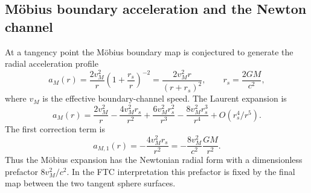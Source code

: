 \documentclass[11pt,a4paper]{article}
\begin{document}
\subsection{M\"obius boundary acceleration and the Newton channel}

At a tangency point the M\"obius boundary map is conjectured to generate the
radial acceleration profile
\begin{equation}
  a_M(r)=\frac{2v_M^2}{r}\!\left(1+\frac{r_s}{r}\right)^{-2}
       =\frac{2v_M^2r}{(r+r_s)^2},\qquad
  r_s=\frac{2GM}{c^2},
  \label{eq:mobius_accel}
\end{equation}
where $v_M$ is the effective boundary-channel speed.  The Laurent expansion is
\begin{equation}
  a_M(r)=\frac{2v_M^2}{r}-\frac{4v_M^2r_s}{r^2}
  +\frac{6v_M^2r_s^2}{r^3}-\frac{8v_M^2r_s^3}{r^4}+O(r_s^4/r^5).
  \label{eq:laurent}
\end{equation}
The first correction term is
\begin{equation}
  a_{M,1}(r)=-\frac{4v_M^2r_s}{r^2}
  =-\frac{8v_M^2}{c^2}\frac{GM}{r^2}.
  \label{eq:mobius_newton_prefactor}
\end{equation}
Thus the M\"obius expansion has the Newtonian radial form with a dimensionless
prefactor $8v_M^2/c^2$.  In the FTC interpretation this prefactor is fixed by
the final map between the two tangent sphere surfaces.
\end{document}
